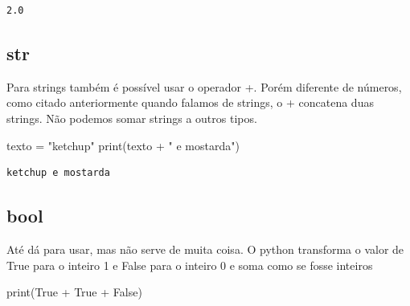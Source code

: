 \documentclass[
  letterpaper,
  DIV=11,
  numbers=noendperiod]{scrreprt}
\newenvironment{Shaded}{\begin{snugshade}}{\end{snugshade}}
\newcommand{\BuiltInTok}[1]{\textcolor[rgb]{0.00,0.23,0.31}{#1}}
\newcommand{\NormalTok}[1]{\textcolor[rgb]{0.00,0.23,0.31}{#1}}
\newcommand{\OperatorTok}[1]{\textcolor[rgb]{0.37,0.37,0.37}{#1}}
\newcommand{\StringTok}[1]{\textcolor[rgb]{0.13,0.47,0.30}{#1}}
\newcommand{\VariableTok}[1]{\textcolor[rgb]{0.07,0.07,0.07}{#1}}
\begin{document}
\begin{tcolorbox}[enhanced jigsaw, breakable, leftrule=.75mm, left=2mm, opacityback=0, bottomrule=.15mm, toprule=.15mm, rightrule=.15mm, arc=.35mm, colback=white]

\begin{verbatim}
2.0
\end{verbatim}

\end{tcolorbox}

\hypertarget{str-1}{%
\subsection{str}\label{str-1}}

Para strings também é possível usar o operador +. Porém diferente de
números, como citado anteriormente quando falamos de strings, o +
concatena duas strings. Não podemos somar strings a outros tipos.

\begin{Shaded}
\begin{Highlighting}[]
\NormalTok{texto }\OperatorTok{=} \StringTok{"ketchup"}
\BuiltInTok{print}\NormalTok{(texto }\OperatorTok{+} \StringTok{" e mostarda"}\NormalTok{)}
\end{Highlighting}
\end{Shaded}

\begin{tcolorbox}[enhanced jigsaw, breakable, leftrule=.75mm, left=2mm, opacityback=0, bottomrule=.15mm, toprule=.15mm, rightrule=.15mm, arc=.35mm, colback=white]

\begin{verbatim}
ketchup e mostarda
\end{verbatim}

\end{tcolorbox}

\hypertarget{bool-1}{%
\subsection{bool}\label{bool-1}}

Até dá para usar, mas não serve de muita coisa. O python transforma o
valor de True para o inteiro 1 e False para o inteiro 0 e soma como se
fosse inteiros

\begin{Shaded}
\begin{Highlighting}[]
\BuiltInTok{print}\NormalTok{(}\VariableTok{True} \OperatorTok{+} \VariableTok{True} \OperatorTok{+} \VariableTok{False}\NormalTok{)}
\end{Highlighting}
\end{Shaded}
\end{document}
